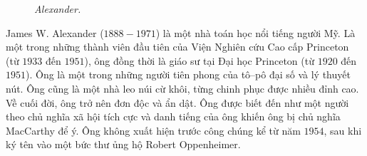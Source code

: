 \begin{multicols}{2}
\begin{tBox}
\begin{figure}
			\caption{\small\textit{\color{duongvaotoanhoc}Alexander.}}
			\vspace*{-10pt}
		\end{figure}
		James W. Alexander ($1888-1971$) là một nhà toán học nổi tiếng người Mỹ. Là một trong những thành viên đầu tiên của Viện Nghiên cứu Cao cấp Princeton (từ $1933$ đến $1951$), ông đồng thời là giáo sư tại Đại học Princeton (từ $1920$ đến $1951$). Ông là một trong những người tiên phong của tô--pô đại số và lý thuyết nút. Ông cũng là một nhà leo núi cừ khôi, từng chinh phục được nhiều đỉnh cao. Về cuối đời, ông trở nên đơn độc và ẩn dật. Ông được biết đến như một người theo chủ nghĩa xã hội tích cực và danh tiếng của ông khiến ông bị chủ nghĩa MacCarthy để ý. Ông không xuất hiện trước công chúng kể từ năm $1954$, sau khi ký tên vào một bức thư ủng hộ Robert Oppenheimer.
	\end{tBox}


\end{multicols}
